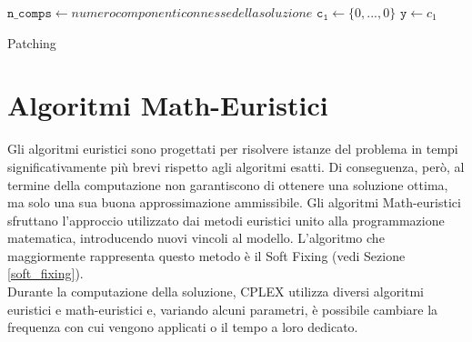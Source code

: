 \begin{algorithm}[h]
\DontPrintSemicolon
{}
\BlankLine
$\mathtt{n\_comps \gets} numero componenti connesse della soluzione$\;
\BlankLine
$\mathtt{c_1\gets}\{0,...,0\}$\;
\BlankLine
{}
$\mathtt{y \gets} c_1$\;
\caption{Patching}
\end{algorithm}

\section{Algoritmi Math-Euristici}
Gli algoritmi euristici sono progettati per risolvere istanze del problema in tempi significativamente più brevi rispetto agli algoritmi esatti. Di conseguenza, però, al termine della computazione non garantiscono di ottenere una soluzione ottima, ma solo una sua buona approssimazione ammissibile. Gli algoritmi Math-euristici sfruttano l'approccio utilizzato dai metodi euristici unito alla programmazione matematica, introducendo nuovi vincoli al modello. L'algoritmo che maggiormente rappresenta questo metodo è il Soft Fixing (vedi Sezione \ref{soft_fixing}). \\
Durante la computazione della soluzione, CPLEX utilizza diversi algoritmi euristici e math-euristici e, variando alcuni parametri, è possibile cambiare la frequenza con cui vengono applicati o il tempo a loro dedicato. 

